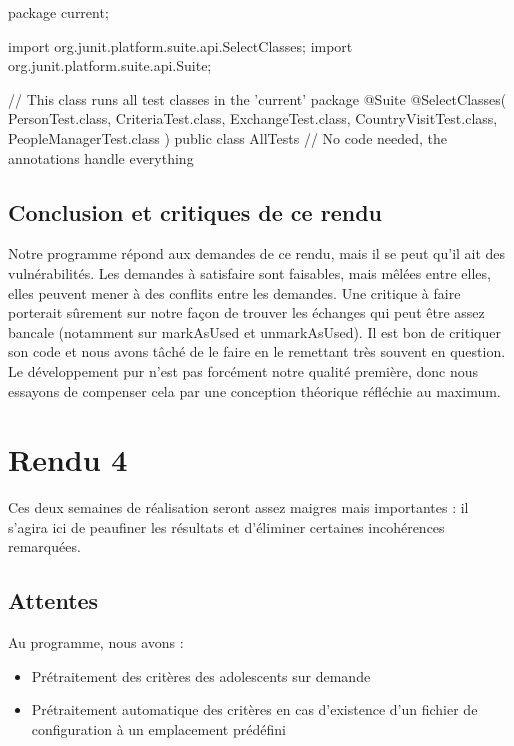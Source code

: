 \documentclass{mytex}
\begin{document}
\begin{codebox}
package current;

import org.junit.platform.suite.api.SelectClasses;
import org.junit.platform.suite.api.Suite;

// This class runs all test classes in the 'current' package
@Suite
@SelectClasses({
	PersonTest.class,
	CriteriaTest.class,
	ExchangeTest.class,
	CountryVisitTest.class,
	PeopleManagerTest.class
})
public class AllTests {
	// No code needed, the annotations handle everything
}
\end{codebox}

\subsection{Conclusion et critiques de ce rendu}

Notre programme répond aux demandes de ce rendu, mais il se peut qu'il ait des vulnérabilités. Les demandes à satisfaire sont faisables, mais mêlées entre elles, elles peuvent mener à des conflits entre les demandes. Une critique à faire porterait sûrement sur notre façon de trouver les échanges qui peut être assez bancale (notamment sur markAsUsed et unmarkAsUsed). Il est bon de critiquer son code et nous avons tâché de le faire en le remettant très souvent en question. Le développement pur n'est pas forcément notre qualité première, donc nous essayons de compenser cela par une conception théorique réfléchie au maximum.

\section{Rendu 4}

Ces deux semaines de réalisation seront assez maigres mais importantes : il s'agira ici de peaufiner les résultats et d'éliminer certaines incohérences remarquées.


\subsection{Attentes}

Au programme, nous avons :

\begin{itemize}
	\item Prétraitement des critères des adolescents sur demande
	\item Prétraitement automatique des critères en cas d’existence d’un fichier de configuration à un emplacement prédéfini
\end{itemize}
\end{document}
